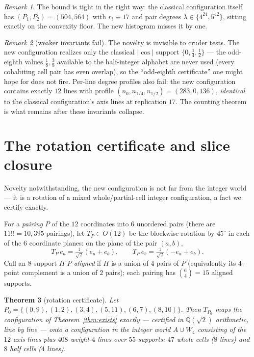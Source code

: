 \documentclass[11pt]{article}
\newtheorem{theorem}{Theorem}
\theoremstyle{remark}
\newtheorem{remark}[theorem]{Remark}
\newcommand{\QQ}{\mathbb{Q}}
\begin{document}
\begin{remark}
The bound is tight in the right way: the classical configuration itself has
$(P_1,P_2)=(504,564)$ with $r_i\equiv17$ and pair degrees
$\lambda\in\{4^{24},5^{42}\}$, sitting exactly on the convexity floor.
The new histogram misses it by one.
\end{remark}

\begin{remark}[weaker invariants fail]
The novelty is invisible to cruder tests. The new configuration realizes
only the classical $|\cos|$ support $\{0,\tfrac14,\tfrac12\}$ --- the
odd-eighth values $\tfrac18,\tfrac38$ available to the half-integer
alphabet are never used (every cohabiting cell pair has even overlap), so
the ``odd-eighth certificate'' one might hope for does not fire. Per-line
degree profiles also fail: the new configuration contains exactly $12$
lines with profile $(n_0,n_{1/4},n_{1/2})=(283,0,136)$, \emph{identical}
to the classical configuration's axis lines at replication $17$. The
counting theorem is what remains after these invariants collapse.
\end{remark}

\section{The rotation certificate and slice closure}\label{sec:rotation}

Novelty notwithstanding, the new configuration is not far from the integer
world --- it is a rotation of a mixed whole/partial-cell integer
configuration, a fact we certify exactly.

For a \emph{pairing} $P$ of the $12$ coordinates into $6$ unordered pairs
(there are $11!!=10{,}395$ pairings), let $T_P\in O(12)$ be the blockwise
rotation by $45^\circ$ in each of the $6$ coordinate planes: on the plane
of the pair $(a,b)$,
\[
T_P\,e_a=\tfrac{1}{\sqrt2}(e_a+e_b),
\qquad
T_P\,e_b=\tfrac{1}{\sqrt2}(-e_a+e_b).
\]
Call an $8$-support $H$ \emph{$P$-aligned} if $H$ is a union of $4$ pairs
of $P$ (equivalently its $4$-point complement is a union of $2$ pairs);
each pairing has $\binom64=15$ aligned supports.

\begin{theorem}[rotation certificate]\label{thm:rotation}
Let $P_0=\{(0,9),(1,2),(3,4),(5,11),(6,7),(8,10)\}$. Then
$T_{P_0}$ maps the configuration of Theorem~\ref{thm:exists} exactly
--- certified in $\QQ(\sqrt2)$ arithmetic, line by line --- onto a
configuration in the integer world $A\cup W_4$ consisting of the $12$ axis
lines plus $408$ weight-$4$ lines over $55$ supports: $47$ whole cells
($8$ lines) and $8$ half cells ($4$ lines).
\end{theorem}
\end{document}
